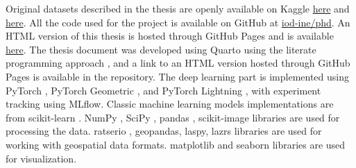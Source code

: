 Original datasets described in the thesis are openly available on Kaggle \href{https://www.kaggle.com/datasets/sentinel3734/tree-detection-lidar-rgb}{here} and \href{https://www.kaggle.com/datasets/sentinel3734/uav-point-clouds-of-individual-trees}{here}.
All the code used for the project is available on GitHub at \href{https://github.com/iod-ine/phd}{iod-ine/phd}.
An HTML version of this thesis is hosted through GitHub Pages and is available \href{https://iod-ine.github.io/thesis}{here}.
The thesis document was developed using Quarto \cite{Allaire_Quarto_2024} using the literate programming approach \cite{knuth84}, and a link to an HTML version hosted through GitHub Pages is available in the repository.
The deep learning part is implemented using PyTorch \cite{Ansel_PyTorch_2_Faster_2024}, PyTorch Geometric \cite{Fey_Fast_Graph_Representation_2019}, and PyTorch Lightning \cite{Falcon_PyTorch_Lightning_2019}, with experiment tracking using MLflow.
Classic machine learning models implementations are from scikit-learn \cite{scikit-learn}.
NumPy \cite{2020NumPy-Array}, SciPy \cite{2020SciPy-NMeth}, pandas \cite{The_pandas_development_team_pandas-dev_pandas_Pandas}, scikit-image \cite{van_der_Walt_scikit-image_image_processing_2014} libraries are used for processing the data.
ratserio \cite{gillies_2019}, geopandas, laspy, lazrs libraries are used for working with geospatial data formats.
matplotlib \cite{Hunter_Matplotlib_A_2D_2007} and seaborn \cite{waskomSeabornStatisticalData2021} libraries are used for visualization.
